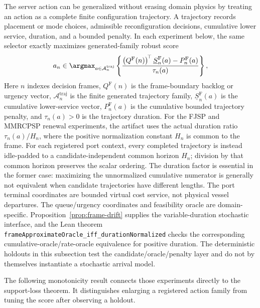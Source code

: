 \documentclass[opre,dblanonrev]{informs4}
\begin{document}
The server action can be generalized without erasing domain physics by treating
an action as a complete finite configuration trajectory.  A trajectory records
placement or mode choices, admissible reconfiguration decisions, cumulative
lower service, duration, and a bounded penalty.  In each experiment below, the
same selector exactly maximizes generated-family robust score
\begin{equation}
  a_n\in\argmax_{a\in\mathcal A_n^{\mathrm{traj}}}
  \left\{
    \frac{
      \left(Q^{\mathrm F}(n)\right)^{\!\top}
      \underline S_n^{\mathrm F}(a)-P_n^{\mathrm F}(a)}
    {\tau_n(a)}
  \right\},
  \label{eq:trajectory-selector}
\end{equation}
Here \(n\) indexes decision frames, \(Q^{\mathrm F}(n)\) is the frame-boundary
backlog or urgency vector, \(\mathcal A_n^{\mathrm{traj}}\) is the finite
generated trajectory family, \(\underline S_n^{\mathrm F}(a)\) is the
cumulative lower-service vector, \(P_n^{\mathrm F}(a)\) is the cumulative
bounded trajectory penalty, and \(\tau_n(a)>0\) is the trajectory duration.
For the FJSP and MMRCPSP renewal experiments, the artifact uses the actual
duration ratio \(\tau_n(a)/H_n\), where the positive normalization constant
\(H_n\) is common to the frame.  For each registered port context, every
completed trajectory is instead idle-padded to a candidate-independent common
horizon \(H_n\); division by that common horizon preserves the scalar ordering.
The duration factor is essential in the former case: maximizing the
unnormalized cumulative numerator is generally not equivalent when candidate
trajectories have different lengths.  The port terminal coordinates are
bounded virtual cost service, not physical vessel departures.  The
queue/urgency coordinates and feasibility oracle are domain-specific.
Proposition~\ref{prop:frame-drift} supplies the
variable-duration stochastic interface, and the Lean theorem
\texttt{frameApproximateOracle\_iff\_durationNormalized} checks the corresponding
cumulative-oracle/rate-oracle equivalence for positive duration.  The
deterministic holdouts in this subsection test the candidate/oracle/penalty
layer and do not by themselves instantiate a stochastic arrival model.

The following monotonicity result connects those experiments directly to the
support-loss theorem.  It distinguishes enlarging a registered action family
from tuning the score after observing a holdout.
\end{document}
